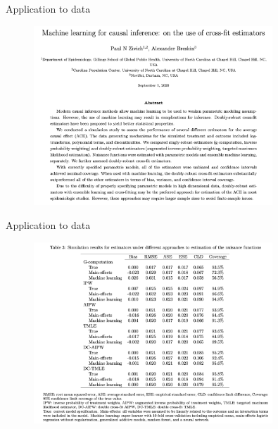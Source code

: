 \documentclass[xcolor={table}, handout]{beamer}
\begin{document}
\begin{frame}{Application to data}
\cite{zivich2021machine}

\begin{figure}
\centering
\includegraphics[width = 0.8\textwidth]{../assets/zivich-breskin.png}
\end{figure}
\hfill
\end{frame}



\begin{frame}{Application to data}
\cite{zivich2021machine}

\begin{figure}
\centering
\includegraphics[width = 0.8\textwidth]{../assets/zivich-breskin_table3.png}
\end{figure}
\hfill
\end{frame}
\end{document}
